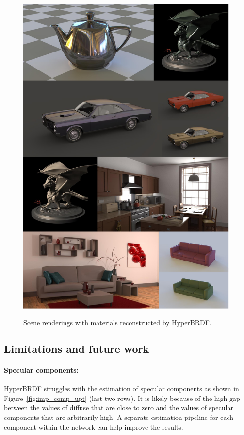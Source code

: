 \begin{figure}[ht]
  \centering
  {\includegraphics[width=0.95\linewidth]{Chapters/hyperbrdf-figs/SceneRenderings1.pdf}}
   \caption{Scene renderings with materials reconstructed by HyperBRDF.}
   \label{fig:scene-render}
\end{figure}

\subsection{Limitations and future work}\label{sec:limits}
\paragraph{Specular components:} HyperBRDF struggles with the estimation of specular components as shown in Figure~\ref{fig:imp_comp_upt} (last two rows). It is likely because of the high gap between the values of diffuse that are close to zero and the values of specular components that are arbitrarily high. A separate estimation pipeline for each component within the network can help improve the results.


